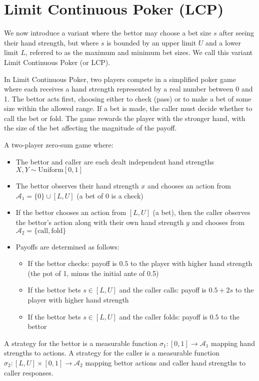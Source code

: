 \documentclass[../../main/main.tex]{subfiles}
\begin{document}
\section{Limit Continuous Poker (LCP)}
We now introduce a variant where the bettor may choose a bet size $s$ after seeing their hand strength, but where $s$ is bounded by an upper limit $U$ and a lower limit $L$, referred to as the maximum and minimum bet sizes. We call this variant  Limit Continuous Poker (or LCP).

In Limit Continuous Poker, two players compete in a simplified poker game where each receives a hand strength represented by a real number between 0 and 1. The bettor acts first, choosing either to check (pass) or to make a bet of some size within the allowed range. If a bet is made, the caller must decide whether to call the bet or fold. The game rewards the player with the stronger hand, with the size of the bet affecting the magnitude of the payoff.

\begin{definition}[LCP]
A two-player zero-sum game where:
\begin{itemize}
    \item The bettor and caller are each dealt independent hand strengths $X, Y \sim \text{Uniform}[0,1]$
    \item The bettor observes their hand strength $x$ and chooses an action from $\mathcal{A}_1 = \{\text{0}\} \cup [L, U]$ (a bet of 0 is a check)
    \item If the bettor chooses an action from $[L, U]$ (a bet), then the caller observes the bettor's action along with their own hand strength $y$ and chooses from $\mathcal{A}_2 = \{\text{call}, \text{fold}\}$ 
    \item Payoffs are determined as follows:
    \begin{itemize}
        \item If the bettor checks: payoff is $0.5$ to the player with higher hand strength (the pot of 1, minus the initial ante of 0.5)
        \item If the bettor bets $s \in [L, U]$ and the caller calls: payoff is $0.5 + 2s$ to the player with higher hand strength
        \item If the bettor bets $s \in [L, U]$ and the caller folds: payoff is $0.5$ to the bettor
    \end{itemize}
\end{itemize}

A strategy for the bettor is a measurable function $\sigma_1: [0,1] \to \mathcal{A}_1$ mapping hand strengths to actions. A strategy for the caller is a measurable function $\sigma_2: [L, U] \times [0, 1] \to \mathcal{A}_2$ mapping bettor actions and caller hand strengths to caller responses.
\end{definition}
\end{document}
